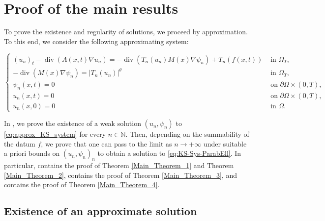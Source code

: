 \documentclass{amsart}
\numberwithin{equation}{section}
\def\N{\mathbb{N}}
\begin{document}
\section{Proof of the main results}
{To prove the existence and regularity of solutions, we proceed by approximation. To this end, we consider the following approximating system:

\begin{equation}\label{eq:approx_KS_system}
    \left\{\begin{array}{cc}
    (u_n)_t-\operatorname{div}(A(x, t) \nabla u_n)=-\operatorname{div}(T_n(u_n) M(x) \nabla \psi_n)+T_n(f(x,t)) & \text { in } \Omega_T, \\
    -\operatorname{div}(M(x) \nabla \psi_n)=|T_n(u_n)|^\theta & \text { in } \Omega_T, \\
    \psi_n(x, t)=0 & \text { on } \partial\Omega\times(0, T), \\
    u_n(x, t)=0 & \text { on } \partial\Omega\times(0, T), \\
    u_n(x, 0)=0 & \text { in } \Omega.
    \end{array}\right.
\end{equation}

In , we prove the existence of a weak solution $(u_n,\psi_n)$ to \eqref{eq:approx_KS_system} for every $n\in\N$. Then, depending on the summability of the datum $f$, we prove that one can pass to the limit as $n\to+\infty$ under suitable a priori bounds on $(u_n,\psi_n)_n$ to obtain a solution to \eqref{eq:KS-Sys-ParabEll}. In particular,  contains the proof of Theorem \ref{Main_Theorem_1} and Theorem \ref{Main_Theorem_2},  contains the proof of Theorem \ref{Main_Theorem_3}, and  contains the proof of Theorem \ref{Main_Theorem_4}.
}

\subsection{Existence of an approximate solution}\label{sec:existenceapprox}
\end{document}
